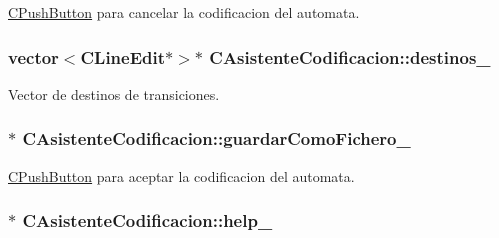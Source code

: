 \hyperlink{classCPushButton}{C\+Push\+Button} para cancelar la codificacion del automata. 

\subsubsection[{\texorpdfstring{destinos\+\_\+}{destinos_}}]{\setlength{\rightskip}{0pt plus 5cm}vector$<${\bf C\+Line\+Edit}$\ast$$>$$\ast$ C\+Asistente\+Codificacion\+::destinos\+\_\+\hspace{0.3cm}{\ttfamily [private]}}\hypertarget{classCAsistenteCodificacion_a421a87b8ddfa213452349bcf55b22d27}{}\label{classCAsistenteCodificacion_a421a87b8ddfa213452349bcf55b22d27}


Vector de destinos de transiciones. 

\subsubsection[{\texorpdfstring{guardar\+Como\+Fichero\+\_\+}{guardarComoFichero_}}]{$\ast$ C\+Asistente\+Codificacion\+::guardar\+Como\+Fichero\+\_\+\hspace{0.3cm}{\ttfamily [private]}}\hypertarget{classCAsistenteCodificacion_a898ca68d14748bb8bd7d4694e80d3da8}{}\label{classCAsistenteCodificacion_a898ca68d14748bb8bd7d4694e80d3da8}


\hyperlink{classCPushButton}{C\+Push\+Button} para aceptar la codificacion del automata. 

\subsubsection[{\texorpdfstring{help\+\_\+}{help_}}]{$\ast$ C\+Asistente\+Codificacion\+::help\+\_\+\hspace{0.3cm}{\ttfamily [private]}}\hypertarget{classCAsistenteCodificacion_a8d7ffb128dc1d576413d2a9a74f3884f}{}\label{classCAsistenteCodificacion_a8d7ffb128dc1d576413d2a9a74f3884f}


